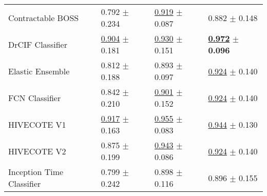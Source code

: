 \begin{tabular}{llll}
Contractable BOSS & \textcolor[rgb]{0.3221757322,0.5000000000,0}{0.792} $\pm$ \textcolor[rgb]{0.9121281608,0.0878718392,0}{0.234} & \underline{\textcolor[rgb]{0.3127962085,0.5000000000,0}{0.919}} $\pm$ \textcolor[rgb]{0.2290816130,0.5000000000,0}{0.087} & \textcolor[rgb]{0.3611111111,0.5000000000,0}{0.882} $\pm$ \textcolor[rgb]{0.4865294757,0.5000000000,0}{0.148} \\
DrCIF Classifier & \underline{\textcolor[rgb]{0.0736401674,0.5000000000,0}{0.904}} $\pm$ \textcolor[rgb]{0.6501555575,0.3498444425,0}{0.181} & \underline{\textcolor[rgb]{0.2488151659,0.5000000000,0}{0.930}} $\pm$ \textcolor[rgb]{0.9643140232,0.0356859768,0}{0.151} & \underline{\textbf{\textcolor[rgb]{0.0000000000,0.5000000000,0}{0.972}}} $\pm$ \textbf{\textcolor[rgb]{0.0000000000,0.5000000000,0}{0.096}} \\
Elastic Ensemble & \textcolor[rgb]{0.2761506276,0.5000000000,0}{0.812} $\pm$ \textcolor[rgb]{0.6846520220,0.3153479780,0}{0.188} & \textcolor[rgb]{0.4691943128,0.5000000000,0}{0.893} $\pm$ \textcolor[rgb]{0.3427404441,0.5000000000,0}{0.097} & \underline{\textcolor[rgb]{0.1944444444,0.5000000000,0}{0.924}} $\pm$ \textcolor[rgb]{0.4049258024,0.5000000000,0}{0.140} \\
FCN Classifier & \textcolor[rgb]{0.2117154812,0.5000000000,0}{0.842} $\pm$ \textcolor[rgb]{0.7904432447,0.2095567553,0}{0.210} & \underline{\textcolor[rgb]{0.4194312796,0.5000000000,0}{0.901}} $\pm$ \textcolor[rgb]{0.9727218435,0.0272781565,0}{0.152} & \underline{\textcolor[rgb]{0.1944444444,0.5000000000,0}{0.924}} $\pm$ \textcolor[rgb]{0.4049258024,0.5000000000,0}{0.140} \\
HIVECOTE V1 & \underline{\textcolor[rgb]{0.0460251046,0.5000000000,0}{0.917}} $\pm$ \textcolor[rgb]{0.5577723962,0.4422276038,0}{0.163} & \underline{\textcolor[rgb]{0.0995260664,0.5000000000,0}{0.955}} $\pm$ \textcolor[rgb]{0.1853514393,0.5000000000,0}{0.083} & \underline{\textcolor[rgb]{0.1111111111,0.5000000000,0}{0.944}} $\pm$ \textcolor[rgb]{0.3121982484,0.5000000000,0}{0.130} \\
HIVECOTE V2 & \textcolor[rgb]{0.1380753138,0.5000000000,0}{0.875} $\pm$ \textcolor[rgb]{0.7390823473,0.2609176527,0}{0.199} & \underline{\textcolor[rgb]{0.1706161137,0.5000000000,0}{0.943}} $\pm$ \textcolor[rgb]{0.2209016468,0.5000000000,0}{0.086} & \underline{\textcolor[rgb]{0.1944444444,0.5000000000,0}{0.924}} $\pm$ \textcolor[rgb]{0.4049258024,0.5000000000,0}{0.140} \\
Inception Time Classifier & \textcolor[rgb]{0.3068340307,0.5000000000,0}{0.799} $\pm$ \textcolor[rgb]{0.9509603921,0.0490396079,0}{0.242} & \textcolor[rgb]{0.4360189573,0.5000000000,0}{0.898} $\pm$ \textcolor[rgb]{0.5628062518,0.4371937482,0}{0.116} & \textcolor[rgb]{0.3055555556,0.5000000000,0}{0.896} $\pm$ \textcolor[rgb]{0.5510216208,0.4489783792,0}{0.155} \\

\end{tabular}
